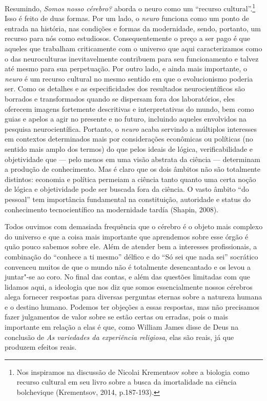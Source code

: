 Resumindo, \emph{Somos nosso cérebro?} aborda o neuro como um ``recurso
cultural''.\footnote{Nos inspiramos na discussão de Nicolai Krementsov sobre a biologia
como recurso cultural em seu livro sobre a busca da imortalidade na
ciência bolchevique (Krementsov, 2014, p.187-193).} Isso é feito de duas formas. Por um lado,
o \emph{neuro} funciona como um ponto de entrada na história, nas
condições e formas da modernidade, sendo, portanto, um recurso para nós
como estudiosos. Consequentemente o preço a ser pago é que aqueles que
trabalham criticamente com o universo que aqui caracterizamos como o das
neuroculturas inevitavelmente contribuem para seu funcionamento e talvez
até mesmo para sua perpetuação. Por outro lado, e ainda mais importante,
o \emph{neuro} é um recurso cultural no mesmo sentido em que o
evolucionismo poderia ser. Como os detalhes e as especificidades dos
resultados neurocientíficos são borrados e transformados quando se
dispersam fora dos laboratórios, eles oferecem imagens fortemente
descritivas e interpretativas do mundo, bem como guias e apelos a agir
no presente e no futuro, incluindo aqueles envolvidos na pesquisa
neurocientífica. Portanto, o \emph{neuro} acaba servindo a múltiplos
interesses em contextos determinados mais por considerações econômicas
ou políticas (no sentido mais amplo dos termos) do que pelos ideais de
lógica, verificabilidade e objetividade que --- pelo menos em uma visão
abstrata da ciência --- determinam a produção de conhecimento. Mas é
claro que os dois âmbitos não são totalmente distintos: economia e
política permeiam a ciência tanto quanto uma certa noção de lógica e
objetividade pode ser buscada fora da ciência. O vasto âmbito ``do
pessoal'' tem importância fundamental na constituição, autoridade e
status do conhecimento tecnocientífico na modernidade tardía (Shapin,
2008).

Todos ouvimos com demasiada frequência que o cérebro é o objeto mais
complexo do universo e que a coisa mais importante que aprendemos sobre
esse órgão é quão pouco sabemos sobre ele. Além de atender bem a
interesses profissionais, a combinação do ``conhece a ti mesmo'' délfico
e do ``Só sei que nada sei'' socrático convenceu muitos de que o mundo
não é totalmente desencantado e os levou a juntar"-se ao coro. No final
das contas, e além das questões limitadas com que lidamos aqui, a
ideologia que nos diz que somos essencialmente nossos cérebros alega
fornecer respostas para diversas perguntas eternas sobre a natureza
humana e o destino humano. Podemos ter objeções a essas respostas, mas
não precisamos fazer julgamentos de valor sobre se estão certas ou
erradas, pois o mais importante em relação a elas é que, como William
James disse de Deus na conclusão de \emph{As variedades da experiência
religiosa}, elas são reais, já que produzem efeitos reais.

